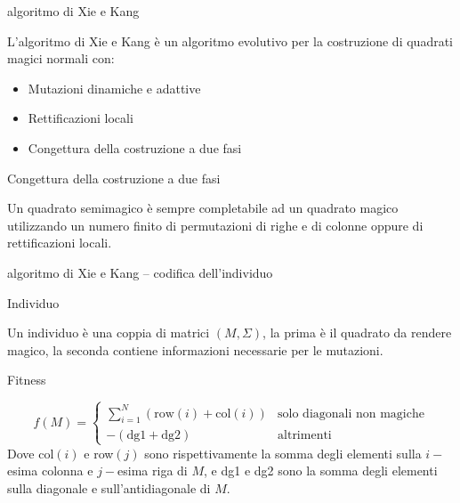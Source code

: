 \documentclass[10pt]{beamer}
\begin{document}
\begin{frame}{algoritmo di Xie e Kang}
			\parbox{0.98\columnwidth}{
			L'algoritmo di Xie e Kang è un algoritmo evolutivo per la costruzione di quadrati magici normali con:
			\begin{itemize}
				\item Mutazioni dinamiche e adattive
				\item Rettificazioni locali
				\item Congettura della costruzione a due fasi
			\end{itemize}
		}

		\begin{alertblock}{Congettura della costruzione a due fasi}
		\parbox{0.98\columnwidth}{
Un quadrato semimagico è sempre completabile ad un quadrato magico utilizzando un numero finito di permutazioni di righe e di colonne oppure di rettificazioni locali.
		}
		\end{alertblock}
\end{frame}

\begin{frame}{algoritmo di Xie e Kang -- codifica dell'individuo}
    \begin{block}{Individuo}
    	\parbox{0.98\columnwidth}{
	    	Un individuo è una coppia di matrici $ (M,\Sigma) $, la prima è il quadrato da rendere magico, la seconda contiene informazioni necessarie per le mutazioni.
    	}
    \end{block}	
     \begin{block}{Fitness}
     	\parbox{0.98\columnwidth}{
			\[ f(M) = 
			\begin{cases}
			\sum_{i = 1}^{N}\left(\text{row}(i) + \text{col}(i) \right) & \text{solo diagonali non magiche} \\
			- \left(\text{dg1} + \text{dg2} \right) & \text{altrimenti} 
			\end{cases}
			\]
		Dove col$ (i) $ e row$ (j) $ sono rispettivamente la somma degli elementi sulla $ i- $esima colonna e $ j- $esima riga di $ M $, e dg1 e dg2 sono la somma degli elementi sulla diagonale e sull'antidiagonale di $ M $.
     	}
     \end{block}	
\end{frame}
\end{document}
